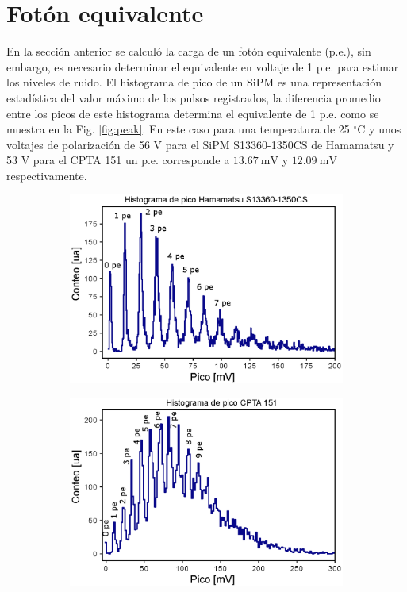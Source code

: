 \section{Fotón equivalente}
En la sección anterior se calculó la carga de un fotón equivalente (p.e.), sin embargo, es necesario determinar el equivalente en voltaje de 1 p.e. para estimar los niveles de ruido. El histograma de pico de un SiPM es una representación estadística del valor máximo de los pulsos registrados, la diferencia promedio entre los picos de este histograma determina el equivalente de 1 p.e. como se muestra en la Fig. \ref{fig:peak}. En este caso para una temperatura de 25 $^\circ$C y unos voltajes de polarización de 56 V para el SiPM S13360-1350CS de Hamamatsu y 53 V para el  CPTA 151 un p.e. corresponde a $13.67~\mbox{mV}$ y $12.09~\mbox{mV}$ respectivamente.    
\begin{figure}[h!]
     \centering
     \begin{subfigure}[b]{0.49\textwidth}
         \centering
         \includegraphics[width=1.1\textwidth]{Images/Peak_1350CS.eps}
         \caption{}
         \label{fig:peak_1350CS}
     \end{subfigure}
     \begin{subfigure}[b]{0.49\textwidth}
         \centering
         \includegraphics[width=1.1\textwidth]{Images/Peak_CPTA.eps}

\end{subfigure}
\end{figure}
